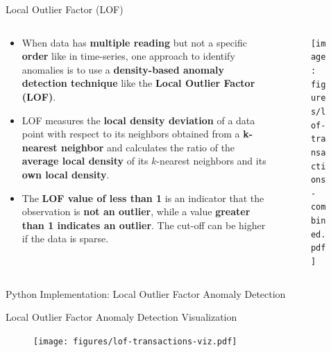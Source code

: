 \documentclass[document.tex]{subfiles}
\begin{document}
    \begin{frame}{Local Outlier Factor (LOF)}
        \begin{columns}
            \begin{column}{0.6\textwidth}
                \begin{itemize}
                    \item When data has \textbf{multiple reading} but not a specific \textbf{order} like in time-series, one approach to identify anomalies is to use a \textbf{density-based anomaly detection technique} like the \textbf{Local Outlier Factor (LOF)}. 
                    \item LOF measures the \textbf{local density deviation} of a data point with respect to its neighbors obtained from a \textbf{k-nearest neighbor} and calculates the ratio of the \textbf{average local density} of its $k$-nearest neighbors and its \textbf{own local density}.
                    \item The \textbf{LOF value of less than 1} is an indicator that the observation is \textbf{not an outlier}, while a value \textbf{greater than 1 indicates an outlier}. The cut-off can be higher if the data is sparse.
                \end{itemize}
            \end{column}
            \begin{column}{0.4\textwidth}
                \begin{figure}
                    \label{fig:lof-transactions-combined}
                    \texttt{[image: figures/lof-transactions-combined.pdf]}
                \end{figure}
            \end{column}
        \end{columns}
    \end{frame}

    \begin{frame}{Python Implementation: Local Outlier Factor Anomaly Detection}
        
    \end{frame}

    \begin{frame}{Local Outlier Factor Anomaly Detection Visualization}
        \begin{figure}
            \label{fig:lof-transactions-visualization}
            \texttt{[image: figures/lof-transactions-viz.pdf]}
        \end{figure}
    \end{frame}
\end{document}
